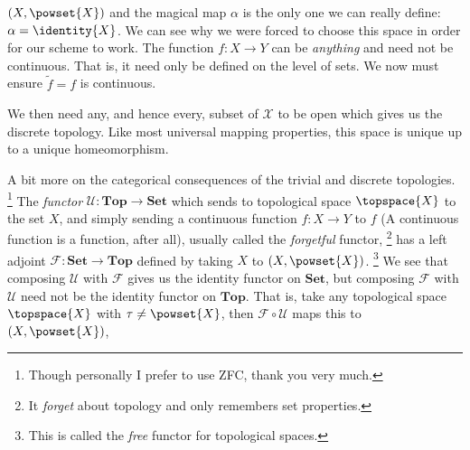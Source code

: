 \documentclass{book}                                                           %
\begin{document}
\begin{example}
\begin{minipage}[t]{0.54\textwidth}
                        $(X,\powset{X})$ and the magical map $\alpha$ is the
                        only one we can really define: $\alpha=\identity{X}$.
                        We can see why we were forced to choose this space in
                        order for our scheme to work. The function
                        $f:X\rightarrow{Y}$ can be \textit{anything} and need
                        not be continuous. That is, it need only be defined on
                        the level of sets. We now must ensure $\tilde{f}=f$ is
                        continuous.
                    \end{minipage}
                    \par\hfill\par
                    We then need any, and hence every, subset of $\mathcal{X}$
                    to be open which gives us the discrete topology. Like most
                    universal mapping properties, this space is unique up to a
                    unique homeomorphism.
                \end{example}
                A bit more on the categorical consequences of the trivial and
                discrete topologies.%
                \footnote{%
                    Though personally I prefer to use ZFC, thank you very much.%
                }
                The \textit{functor} $\mathcal{U}:\mathbf{Top}\rightarrow\mathbf{Set}$
                which sends to topological space $\topspace{X}$ to the set $X$,
                and simply sending a continuous function $f:X\rightarrow{Y}$ to
                $f$ (A continuous function is a function, after all), usually
                called the \textit{forgetful} functor,%
                \footnote{%
                    It \textit{forget} about topology and only remembers set
                    properties.%
                }
                has a left adjoint $\mathcal{F}:\mathbf{Set}\rightarrow\mathbf{Top}$
                defined by taking $X$ to $(X,\powset{X})$.%
                \footnote{%
                    This is called the \textit{free} functor for topological
                    spaces.
                }
                We see that composing $\mathcal{U}$ with $\mathcal{F}$ gives us
                the identity functor on $\mathbf{Set}$, but composing $\mathcal{F}$
                with $\mathcal{U}$
                need not be the identity functor on $\mathbf{Top}$. That is,
                take any topological space $\topspace{X}$ with $\tau\ne\powset{X}$,
                then $\mathcal{F}\circ\mathcal{U}$ maps this to $(X,\powset{X})$,
\end{document}
